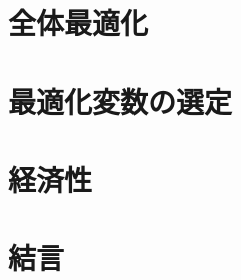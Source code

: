 \documentclass[11pt,aspectratio=43,dvipsnames]{beamer}
\begin{document}
\setcounter{framenumber}{13}
\section{全体最適化}
\section{最適化変数の選定}
\section{経済性}
\section{結言}
\end{document}
